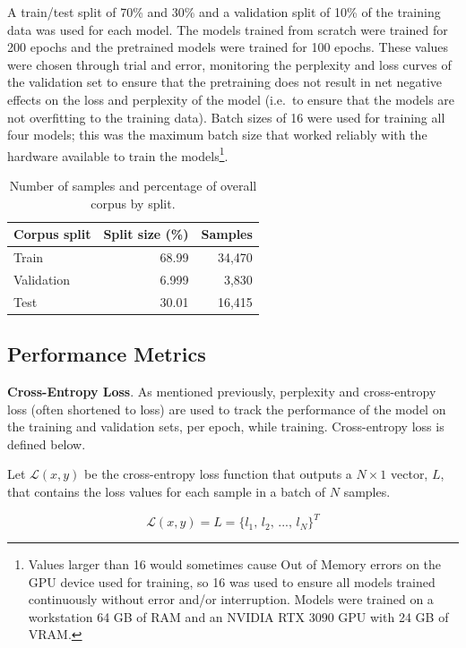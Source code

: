 \documentclass[12pt]{article}
\begin{document}
A train/test split of 70\% and 30\% and a validation split of 10\% of the training data was used for each model. The models trained from scratch were
trained for 200 epochs and the pretrained models were trained for 100 epochs. These values were chosen through trial and error, monitoring the
perplexity and loss curves of the validation set to ensure that the pretraining does not result in net negative effects on the loss and perplexity of
the model (i.e.~to ensure that the models are not overfitting to the training data). Batch sizes of 16 were used for training all four models; this
was the maximum batch size that worked reliably with the hardware available to train the models\footnote{Values larger than 16 would sometimes cause
    Out of Memory errors on the GPU device used for training, so 16 was used to ensure all models trained continuously without error and/or
    interruption. Models were trained on a workstation 64 GB of RAM and an NVIDIA RTX 3090 GPU with 24 GB of VRAM.}.

\begin{table}[!t]
    \centering
    \begin{tabular}{l r r}
        \toprule
        Corpus split & Split size (\%) & Samples \\
        \midrule
        Train        & 68.99           & 34,470  \\
        Validation   & 6.999           & 3,830   \\
        Test         & 30.01           & 16,415  \\
        \bottomrule
    \end{tabular}
    \caption{Number of samples and percentage of overall corpus by split.}
    \label{tab:corpus_splits}
\end{table}

\subsection{Performance Metrics}\label{sec:performance_metrics}
\textbf{Cross-Entropy Loss}. As mentioned previously, perplexity and cross-entropy loss (often shortened to loss) are used to track the performance of
the model on the training and validation sets, per epoch, while training. Cross-entropy loss is defined below.

Let $\mathcal{L}(x, y)$ be the cross-entropy loss function that outputs a $N \times 1$ vector, $L$, that contains the loss values for each sample in a
batch of $N$ samples.

\begin{equation}\label{eq:cross_entropy_defs}
    \mathcal{L}(x, y) = L = \{\mbox{$l_1$, $l_2$, ..., $l_N$}\}^T
\end{equation}
\end{document}
